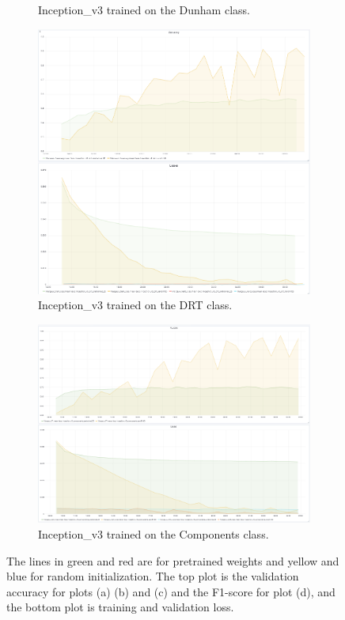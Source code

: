 \begin{figure}
\begin{subfigure}{.6\textwidth}
  \caption{Inception\_v3 trained on the Dunham class.}
  \label{fig:googinit_dunham}
\end{subfigure}
\begin{subfigure}{.6\textwidth}
  \centering
  \includegraphics[width=1\linewidth]{figures/04-go_drt_acc.PNG}
  \caption{Inception\_v3 trained on the DRT class.}
  \label{fig:googinit_drt}
\end{subfigure}%
\begin{subfigure}{.6\textwidth}
  \centering
  \includegraphics[width=1\linewidth]{figures/04-go_conponents_acc.PNG}
  \caption{Inception\_v3 trained on the Components class.}
  \label{fig:googinit_compo}
\end{subfigure}
\caption[Training and validation plots for Inception\_v3]{The lines in green and red are for pretrained weights and yellow and blue for random initialization. The top plot is the validation accuracy for plots (a) (b) and (c) and the F1-score for plot (d), and the bottom plot is training  and validation loss.}
\label{fig:plotsgoog}
\end{figure}

